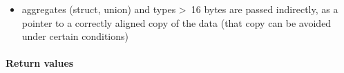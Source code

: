 \begin{itemize}
\begin{itemize}
\end{itemize}
\item aggregates (struct, union) and types \textgreater\ 16 bytes are passed indirectly, as a pointer to a correctly aligned copy of the data (that copy can be avoided under certain conditions)
\end{itemize}

\paragraph{Return values}

